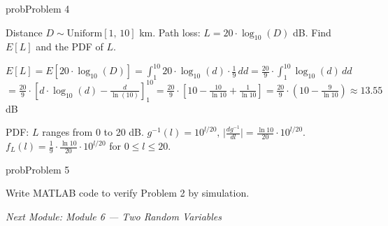\begin{PSbox}[unbreakable]{prob}{Problem 4}

Distance $D \sim \mathrm{Uniform}[1,\, 10]$ km. Path loss: $L = 20 \cdot \log_{10}(D)$ dB. Find $E[L]$ and the PDF of $L$.

\PSsolution{} $\displaystyle E[L] = E[20 \cdot \log_{10}(D)] = \int_{1}^{10} 20 \cdot \log_{10}(d) \cdot \frac{1}{9}\,dd = \frac{20}{9} \cdot \int_{1}^{10} \log_{10}(d)\,dd$\PSbr{}$= \frac{20}{9} \cdot \left[d \cdot \log_{10}(d) - \frac{d}{\ln (10)}\right]_{1}^{10} = \frac{20}{9} \cdot \left[10 - \frac{10}{\ln 10} + \frac{1}{\ln 10}\right] = \frac{20}{9} \cdot \left(10 - \frac{9}{\ln 10}\right) \approx 13.55$ dB

PDF: $L$ ranges from 0 to 20 dB. $g^{-1}(l) = 10^{l/20},\, \lvert \frac{dg^{-1}}{dl}\rvert = \frac{\ln 10}{20} \cdot 10^{l/20}$.\PSbr{}$f_{L}(l) = \frac{1}{9} \cdot \frac{\ln 10}{20} \cdot 10^{l/20}$ for $0 \le l \le 20$.

\end{PSbox}

\begin{PSbox}[unbreakable]{prob}{Problem 5}

Write MATLAB code to verify Problem 2 by simulation.

\PSsolution{} 


\begin{Shaded}
\begin{Highlighting}[]
 \OperatorTok{=} \OperatorTok{;}  \OperatorTok{=} \OperatorTok{;}  \OperatorTok{=} \OperatorTok{;}
 \OperatorTok{=} \OperatorTok{*}\NormalTok{(}\OperatorTok{,}\NormalTok{)}\OperatorTok{;}
 \OperatorTok{=}  \OperatorTok{/} \OperatorTok{;}
\NormalTok{(}\OperatorTok{,} \OperatorTok{\^{}}\OperatorTok{/}\OperatorTok{,} \NormalTok{(}\NormalTok{))}\OperatorTok{;}
\NormalTok{(}\OperatorTok{,} \OperatorTok{{-}}\NormalTok{(}\OperatorTok{*}\OperatorTok{/}\OperatorTok{\^{}}\OperatorTok{,}\NormalTok{)}\OperatorTok{,} \NormalTok{(}\OperatorTok{\textgreater{}}\NormalTok{))}\OperatorTok{;}
\end{Highlighting}
\end{Shaded}

\emph{Next Module: {Module 6 — Two Random Variables}}

\end{PSbox}
